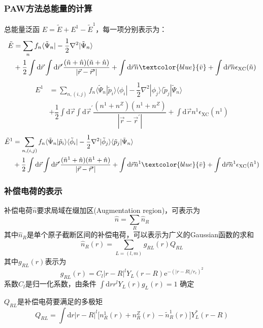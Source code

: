 \frame
{
\frametitle{\textrm{PAW}方法总能量的计算}
总能量泛函
$E=\tilde E+E^1-\tilde E^1$，每一项分别表示为：
\begin{displaymath}
	\begin{aligned}
		\tilde E&=\sum_nf_n\langle\tilde\Psi_n|-\dfrac12\nabla^2|\tilde\Psi_n\rangle\\
		&+\dfrac12\int\mathrm{d}\vec r\int\mathrm{d}\vec r^{\prime}\dfrac{(\tilde n+\hat n)(\tilde n+\hat n)}{|\vec r-\vec r^{\prime}|}+\int\mathrm{d}\vec r \tilde n\textcolor{blue}{\bar v}+\int\mathrm{d}\vec r \tilde n\epsilon_{\mathrm{XC}}(\tilde n)
 	\end{aligned}
\end{displaymath}
\begin{displaymath}
	\begin{aligned}
		E^1&=\sum_{n,(i,j)}f_n\langle\tilde\Psi_n|\tilde p_i\rangle\langle\phi_i|-\dfrac12\nabla^2|\phi_j\rangle\langle\tilde p_j|\tilde\Psi_n\rangle\\
		 &+\dfrac12\int\mathrm{d}\vec r\int\mathrm{d}\vec r^{\prime}\dfrac{(n^1+n^Z)(n^1+n^Z)}{|\vec r-\vec r^{\prime}|}+\int\mathrm{d}\vec r n^1\epsilon_{\mathrm{XC}}(n^1)
 	\end{aligned}
\end{displaymath}
\begin{displaymath}
	\begin{aligned}
		\tilde E^1&=\sum_{n,(i,j)}f_n\langle\tilde\Psi_n|\tilde p_i\rangle\langle\tilde\phi_i|-\dfrac12\nabla^2|\tilde\phi_j\rangle\langle\tilde p_j|\tilde\Psi_n\rangle\\
		&+\dfrac12\int\mathrm{d}\vec r\int\mathrm{d}\vec r^{\prime}\dfrac{(\tilde n^1+\hat n)(\tilde n^1+\hat n)}{|\vec r-\vec r^{\prime}|}+\int\mathrm{d}\vec r \tilde n^1\textcolor{blue}{\bar v}+\int\mathrm{d}\vec r \tilde n^1\epsilon_{\mathrm{XC}}(\tilde n^1)
 	\end{aligned}
\end{displaymath}
}

\frame
{
	\frametitle{补偿电荷的表示}
	补偿电荷$\hat n$要求局域在缀加区(\textrm{Augmentation region})，可表示为
	$$\hat n=\sum_R\hat n_R$$
	其中$\hat n_R$是单个原子截断区间的补偿电荷，可以表示为广义的\textrm{Gaussian}函数的求和
	$$\hat n_R(r)=\sum_{L=(l,m)}g_{RL}(r)Q_{RL}$$
	其中$g_{RL}(r)$表示为
	$$g_{RL}(r)=C_l|r-R|^lY_L(r-R)\mathrm{e}^{-(|r-R|/r_c)^2}$$
	系数$C_l$是归一化系数，由条件
	$\int\mathrm{d}rr^lY_L(r)g_L(r)=1$
	确定

	$Q_{RL}$是补偿电荷要满足的多极矩
	$$Q_{RL}=\int\mathrm{d}r|r-R|^l\big[n_R^1(r)+n_R^Z(r)-\tilde n_R^1(r)\big]Y_L^{\ast}(r-R)$$
}

